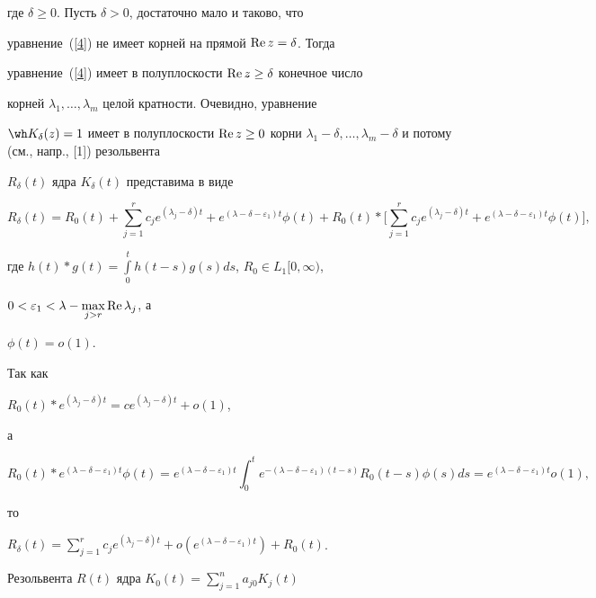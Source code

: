 где $\delta \ge 0$. Пусть $\delta>0$, достаточно мало и таково, что


уравнение~(\ref{4}) не имеет корней на прямой $\operatorname{Re} z=\delta$. Тогда


уравнение~(\ref{4}) имеет в полуплоскости $\operatorname{Re} z \ge \delta$ конечное число


корней $\lambda_1, \dotsc, \lambda_m$ целой кратности. Очевидно, уравнение


$\wh K_{\delta}(z)=1$ имеет в полуплоскости $\re z \ge 0$ корни $\lambda_1-


\delta, \dotsc, \lambda_m-\delta$ и потому (см., напр., [1]) резольвента 


$R_{\delta}(t)$ ядра $K_{\delta }(t)$ представима в виде


$$


R_{\delta}(t)=R_0(t)+\sum\limits_{j=1}^r c_j e^{(\lambda_j-\delta)t}+


e^{(\lambda-\delta-\varepsilon_1)t} \phi (t)+


R_0(t) * \bigg[\sum\limits_{j=1}^r c_j


e^{(\lambda_j-\delta)t}+e^{(\lambda-\delta-\varepsilon_1)t} \phi (t)\bigg],


$$


где $h (t)* g(t)=\int\limits_0^t h(t-s)g(s)ds$, $R_0 \in L_1[0, \infty)$,


$0<\varepsilon_1<\lambda-\max\limits_{j>r} \operatorname{Re} \lambda_j $, а


$\phi(t)=o(1)$.





Так как


$R_0(t) * e^{(\lambda_j-\delta)t}=c e^{(\lambda_j-\delta)t}+o(1)$,


а


$$


R_0 (t)* e^{(\lambda-\delta-\varepsilon_1)t} \phi (t)=e^{(\lambda-\delta-


\varepsilon_1)t} \int_0^t e^{-(\lambda-\delta-\varepsilon_1)(t-s)} 


R_0(t-s)\phi(s)ds


=e^{(\lambda-\delta-\varepsilon_1)t} o(1),


$$


то


$R_{\delta}(t)=\sum\limits_{j=1}^r c_j e^{(\lambda_j-\delta)t}+o (


e^{(\lambda-\delta-\varepsilon_1)t})+R_0(t)$.


Резольвента $R(t)$ ядра $K_{0}(t)=\sum\limits_{j=1}^n a_{j0}K_{j}(t)$ 


